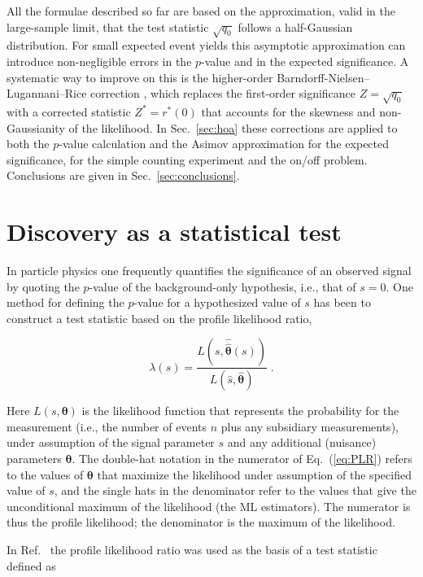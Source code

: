 \documentclass[11pt]{article}
\begin{document}
All the formulae described so far are based on the approximation, valid
in the large-sample limit, that the test statistic $\sqrt{q_0}$
follows a half-Gaussian distribution.  For small expected event yields
this asymptotic approximation can introduce non-negligible errors in
the $p$-value and in the expected significance.  A systematic way to
improve on this is the higher-order Barndorff-Nielsen--Lugannani--Rice
correction \cite{BN86,LR80,Canonero23}, which replaces the
first-order significance $Z = \sqrt{q_0}$ with a corrected statistic
$Z^* = r^*(0)$ that accounts for the skewness and non-Gaussianity of
the likelihood.  In Sec.~\ref{sec:hoa} these corrections are applied
to both the $p$-value calculation and the Asimov approximation for the
expected significance, for the simple counting experiment and the on/off
problem.
Conclusions are given in
Sec.~\ref{sec:conclusions}.

\section{Discovery as a statistical test}
\label{sec:disctest}

In particle physics one frequently quantifies the significance of an
observed signal by quoting the $p$-value of the background-only
hypothesis, i.e., that of $s =0$.  One method for defining the
$p$-value for a hypothesized value of $s$ has been to construct a test
statistic based on the profile likelihood ratio,

\begin{equation}
\label{eq:PLR} 
\lambda(s) = \frac{ L(s, \hat{\hat{\boldsymbol{\theta}}}(s)) } 
{L(\hat{s}, \hat{\boldsymbol{\theta}}) } \;.
\end{equation}

\noindent Here $L(s, \boldsymbol{\theta})$ is the likelihood function that
represents the probability for the measurement (i.e., the number of
events $n$ plus any subsidiary measurements), under assumption of the
signal parameter $s$ and any additional (nuisance) parameters
$\boldsymbol{\theta}$.  The double-hat notation in the numerator of
Eq.~(\ref{eq:PLR}) refers to the values of $\boldsymbol{\theta}$ that
maximize the likelihood under assumption of the specified value of
$s$, and the single hats in the denominator refer to the values that
give the unconditional maximum of the likelihood (the ML estimators).
The numerator is thus the profile likelihood; the denominator is the
maximum of the likelihood.

In Ref.~\cite{asimov} the profile likelihood ratio  was used as the
basis of a test statistic defined as
\end{document}
